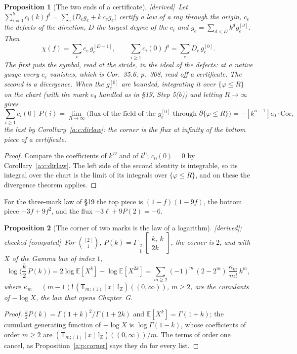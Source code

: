 \documentclass[11pt]{article}
\newcommand{\oE}{\mathbb E}
\newcommand{\sT}{\mathsf T}
\newcommand{\Gst}[4]{\Gamma_{\substack{#1\\#2}}\!\begin{bmatrix}#3\\#4\end{bmatrix}}
\newcommand{\IZ}{\mathbb I_{\mathbb Z}}
\newcommand{\Tx}[3]{(\sT_{#1;(1)}[x]\,#2)((#3,\infty))}
\theoremstyle{plain}
\newtheorem{proposition}{Proposition}[section]
\theoremstyle{definition}
\theoremstyle{remark}
\newcommand{\derived}{\textup{[derived]}}
\newcommand{\computed}{\textup{[computed]}}
\begin{document}
\begin{proposition}[The two ends of a certificate]\label{a:p:certends}\derived\
Let $\sum_{i=0}^hc_i(k)f^i=\sum_e\big(D_eg_e+k\,c_eg_e\big)$ certify a law of a ray through the origin, $c_e$ the defects of the direction, $D$ the largest degree of the $c_i$ and $g_e=\sum_{d<D}k^dg^{[d]}_e$. Then
\[
\chi(f)=\sum_ec_e\,g^{[D-1]}_e,\qquad \sum_{i\ge1}c_i(0)\,f^i=\sum_eD_e\,g^{[0]}_e .
\]
The first puts the symbol, read at the stride, in the ideal of the defects: at a native gauge every $c_e$ vanishes, which is Cor.~35.6, p.~308, read off a certificate. The second is a divergence. When the $g^{[0]}_e$ are bounded, integrating it over $\{\varphi\le R\}$ on the chart (with the mark $e_0$ handled as in \S19, Step 5(b)) and letting $R\to\infty$ gives
\[
\sum_{i\ge1}c_i(0)\,P(i)=\lim_{R\to\infty}\big(\text{flux of the field of the }g^{[0]}_e\text{ through }\partial\{\varphi\le R\}\big)=-[k^{n-1}]c_0\cdot\mathrm{Cor},
\]
the last by Corollary~\ref{a:c:dirlaw}: the corner is the flux at infinity of the bottom piece of a certificate.
\end{proposition}

\begin{proof}
Compare the coefficients of $k^D$ and of $k^0$; $c_0(0)=0$ by Corollary~\ref{a:c:dirlaw}. The left side of the second identity is integrable, so its integral over the chart is the limit of its integrals over $\{\varphi\le R\}$, and on these the divergence theorem applies.
\end{proof}

For the three-mark law of \S19 the top piece is $(1-f)(1-9f)$, the bottom piece $-3f+9f^2$, and the flux $-3\ell+9P(2)=-6$.

\begin{proposition}[The corner of two marks is the law of a logarithm]\label{a:p:gumbel}\derived; checked \computed\
For $\binom{[2]}1$, $P(k)=\Gst21{k,\ k}{2k}$, the corner is $2$, and with $X$ of the Gamma law of index $1$,
\[
\log\Big(\frac k2\,P(k)\Big)=2\log\oE[X^k]-\log\oE[X^{2k}]=\sum_{m\ge2}(-1)^m\,(2-2^m)\,\frac{\kappa_m}{m!}\,k^m,
\]
where $\kappa_m=(m-1)!\,\Tx{m}{\IZ}{0}$, $m\ge2$, are the cumulants of $-\log X$, the law that opens Chapter~G.
\end{proposition}

\begin{proof}
$\frac k2P(k)=\Gamma(1+k)^2/\Gamma(1+2k)$ and $\oE[X^k]=\Gamma(1+k)$; the cumulant generating function of $-\log X$ is $\log\Gamma(1-k)$, whose coefficients of order $m\ge2$ are $\Tx{m}{\IZ}{0}/m$. The terms of order one cancel, as Proposition~\ref{a:p:corner} says they do for every list.
\end{proof}
\end{document}
